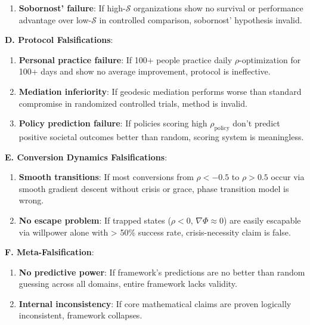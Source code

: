 \documentclass[11pt,a4paper]{article}
\theoremstyle{definition}
\theoremstyle{remark}
\begin{document}
\begin{enumerate}
\begin{mdframed}[backgroundcolor=red!10,linewidth=2pt,linecolor=red!70!black]
\begin{enumerate}
    \item \textbf{Sobornost' failure}: If high-\(\mathcal{S}\) organizations show no survival or performance advantage over low-\(\mathcal{S}\) in controlled comparison, sobornost' hypothesis invalid.
\end{enumerate}

\textbf{D. Protocol Falsifications}:
\begin{enumerate}
    \item \textbf{Personal practice failure}: If 100+ people practice daily \(\rho\)-optimization for 100+ days and show no average improvement, protocol is ineffective.
    
    \item \textbf{Mediation inferiority}: If geodesic mediation performs worse than standard compromise in randomized controlled trials, method is invalid.
    
    \item \textbf{Policy prediction failure}: If policies scoring high \(\rho_{\text{policy}}\) don't predict positive societal outcomes better than random, scoring system is meaningless.
\end{enumerate}

\textbf{E. Conversion Dynamics Falsifications}:
\begin{enumerate}
    \item \textbf{Smooth transitions}: If most conversions from \(\rho < -0.5\) to \(\rho > 0.5\) occur via smooth gradient descent without crisis or grace, phase transition model is wrong.
    
    \item \textbf{No escape problem}: If trapped states (\(\rho < 0\), \(\nabla \Phi \approx 0\)) are easily escapable via willpower alone with > 50\% success rate, crisis-necessity claim is false.
\end{enumerate}

\textbf{F. Meta-Falsification}:
\begin{enumerate}
    \item \textbf{No predictive power}: If framework's predictions are no better than random guessing across all domains, entire framework lacks validity.
    
    \item \textbf{Internal inconsistency}: If core mathematical claims are proven logically inconsistent, framework collapses.
\end{enumerate}
\end{mdframed}


\end{enumerate}
\end{document}
